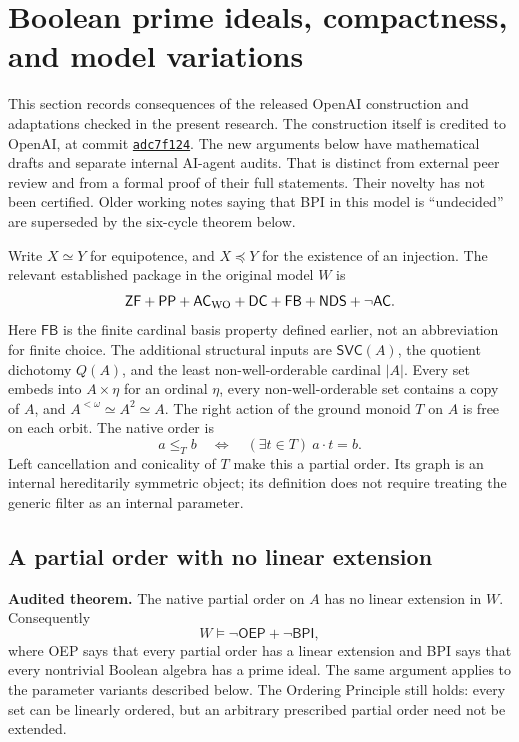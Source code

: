 \section{Boolean prime ideals, compactness, and model variations}
\label{sec:bpi-variants}

This section records consequences of the released OpenAI construction
and adaptations checked in the present research. The construction itself
is credited to OpenAI, at commit
\href{https://github.com/openai/math/commit/adc7f1241b42e322a6451854ab7e4b4c146bf78a}{\texttt{adc7f124}}.
The new arguments below have mathematical drafts and separate internal
AI-agent audits. That is distinct from external peer review and from a
formal proof of their full statements. Their novelty has not been
certified. Older working notes saying that BPI in this model is
``undecided'' are superseded by the six-cycle theorem below.

Write $X\simeq Y$ for equipotence, and $X\preccurlyeq Y$ for the existence
of an injection. The relevant established package in the original model
$W$ is
\[
 \mathsf{ZF}+\mathsf{PP}+\mathsf{AC}_{\rm WO}+\mathsf{DC}
 +\mathsf{FB}+\mathsf{NDS}+\neg\mathsf{AC}.
\]
Here $\mathsf{FB}$ is the finite cardinal basis property defined earlier,
not an abbreviation for finite choice. The additional structural inputs
are $\mathsf{SVC}(A)$, the quotient dichotomy $Q(A)$, and the least
non-well-orderable cardinal $|A|$. Every set embeds into $A\times\eta$
for an ordinal $\eta$, every non-well-orderable set contains a copy of
$A$, and $A^{<\omega}\simeq A^2\simeq A$. The right action of the ground
monoid $T$ on $A$ is free on each orbit. The native order is
\[
 a\leq_T b\quad\Longleftrightarrow\quad
 (\exists t\in T)\ a\cdot t=b.
\]
Left cancellation and conicality of $T$ make this a partial order.
Its graph is an internal hereditarily symmetric object; its definition
does not require treating the generic filter as an internal parameter.

\subsection{A partial order with no linear extension}

\textbf{Audited theorem.}
The native partial order on $A$ has no linear extension in $W$.
Consequently
\[
 W\models\neg\mathsf{OEP}+\neg\mathsf{BPI},
\]
where OEP says that every partial order has a linear extension and BPI
says that every nontrivial Boolean algebra has a prime ideal. The same
argument applies to the parameter variants described below. The
Ordering Principle still holds: every set can be linearly ordered,
but an arbitrary prescribed partial order need not be extended.

